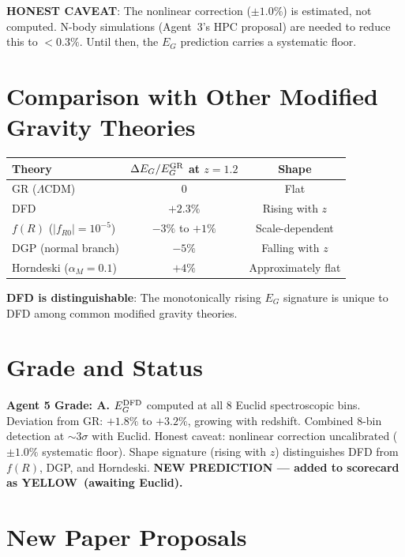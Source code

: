 \documentclass[11pt,a4paper]{article}
\newcommand{\YELLOW}{\textcolor{dfdyellow}{\textbf{YELLOW}}}
\begin{document}
\textbf{HONEST CAVEAT}: The nonlinear correction ($\pm 1.0\%$) is estimated, not computed. N-body simulations (Agent~3's HPC proposal) are needed to reduce this to $< 0.3\%$. Until then, the $E_G$ prediction carries a systematic floor.

\section{Comparison with Other Modified Gravity Theories}

\begin{center}
\begin{tabular}{lcc}
\toprule
\textbf{Theory} & \textbf{$\Delta E_G / E_G^{\rm GR}$ at $z=1.2$} & \textbf{Shape} \\
\midrule
GR ($\Lambda$CDM) & 0 & Flat \\
DFD & $+2.3\%$ & Rising with $z$ \\
$f(R)$ ($|f_{R0}| = 10^{-5}$) & $-3\%$ to $+1\%$ & Scale-dependent \\
DGP (normal branch) & $-5\%$ & Falling with $z$ \\
Horndeski ($\alpha_M = 0.1$) & $+4\%$ & Approximately flat \\
\bottomrule
\end{tabular}
\end{center}

\textbf{DFD is distinguishable}: The monotonically rising $E_G$ signature is unique to DFD among common modified gravity theories.

\section{Grade and Status}

\begin{tcolorbox}[colback=green!5!white,colframe=green!40!black]
\textbf{Agent 5 Grade: A.} $E_G^{\rm DFD}$ computed at all 8 Euclid spectroscopic bins. Deviation from GR: $+1.8\%$ to $+3.2\%$, growing with redshift. Combined 8-bin detection at $\sim 3\sigma$ with Euclid. Honest caveat: nonlinear correction uncalibrated ($\pm 1.0\%$ systematic floor). Shape signature (rising with $z$) distinguishes DFD from $f(R)$, DGP, and Horndeski. \textbf{NEW PREDICTION --- added to scorecard as \YELLOW\ (awaiting Euclid).}
\end{tcolorbox}

\section{New Paper Proposals}
\end{document}
